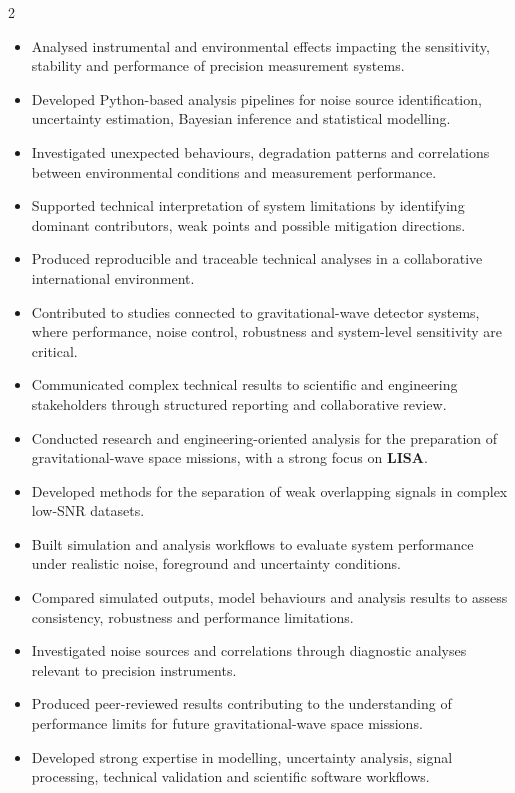 \documentclass[8pt,a4paper,ragged2e,withhyper]{altacv}
\begin{document}
\begin{paracol}{2}

\begin{itemize}
\item Analysed instrumental and environmental effects impacting the sensitivity, stability and performance of precision measurement systems.
\item Developed Python-based analysis pipelines for noise source identification, uncertainty estimation, Bayesian inference and statistical modelling.
\item Investigated unexpected behaviours, degradation patterns and correlations between environmental conditions and measurement performance.
\item Supported technical interpretation of system limitations by identifying dominant contributors, weak points and possible mitigation directions.
\item Produced reproducible and traceable technical analyses in a collaborative international environment.
\item Contributed to studies connected to gravitational-wave detector systems, where performance, noise control, robustness and system-level sensitivity are critical.
\item Communicated complex technical results to scientific and engineering stakeholders through structured reporting and collaborative review.
\end{itemize}

\divider
\newpage


\begin{itemize}
\item Conducted research and engineering-oriented analysis for the preparation of gravitational-wave space missions, with a strong focus on \textbf{LISA}.
\item Developed methods for the separation of weak overlapping signals in complex low-SNR datasets.
\item Built simulation and analysis workflows to evaluate system performance under realistic noise, foreground and uncertainty conditions.
\item Compared simulated outputs, model behaviours and analysis results to assess consistency, robustness and performance limitations.
\item Investigated noise sources and correlations through diagnostic analyses relevant to precision instruments.
\item Produced peer-reviewed results contributing to the understanding of performance limits for future gravitational-wave space missions.
\item Developed strong expertise in modelling, uncertainty analysis, signal processing, technical validation and scientific software workflows.
\end{itemize}


\end{paracol}
\end{document}
